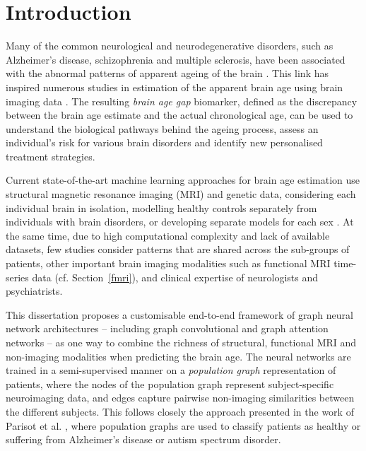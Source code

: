 \chapter{Introduction}



Many of the common neurological and neurodegenerative disorders, such as Alzheimer’s disease, schizophrenia and multiple sclerosis, have been associated with the abnormal patterns of apparent ageing of the brain \cite{kaufmann2019}. This link has inspired numerous studies in estimation of the apparent brain age using brain imaging data \cite{franke2019ten}. The resulting \textit{brain age gap} biomarker, defined as the discrepancy between the brain age estimate and the actual chronological age, can be used to understand the biological pathways behind the ageing process, assess an individual’s risk for various brain disorders and identify new personalised treatment strategies.

Current state-of-the-art machine learning approaches for brain age estimation use structural magnetic resonance imaging (MRI) and genetic data, considering each individual brain in isolation, modelling healthy controls separately from individuals with brain disorders, or developing separate models for each sex \cite{kaufmann2019,niu2019improved}. At the same time, due to high computational complexity and lack of available datasets, few studies consider patterns that are shared across the sub-groups of patients, other important brain imaging modalities such as functional MRI time-series data (cf. Section~\ref{fmri}), and clinical expertise of neurologists and psychiatrists.

This dissertation proposes a customisable end-to-end framework of graph neural network architectures – including graph convolutional \cite{kipf2017semi} and graph attention \cite{velickovic2018graph} networks – as one way to combine the richness of structural, functional MRI and non-imaging modalities when predicting the brain age. The neural networks are trained in a semi-supervised manner on a \textit{population graph} representation of patients, where the nodes of the population graph represent subject-specific neuroimaging data, and edges capture pairwise non-imaging similarities between the different subjects. This follows closely the approach presented in the work of Parisot et al. \cite{parisot2017spectral,parisot2018disease}, where population graphs are used to classify patients as healthy or suffering from Alzheimer's disease or autism spectrum disorder.

